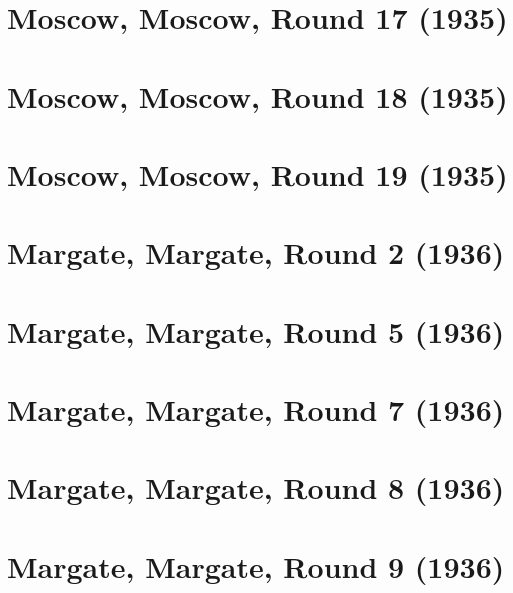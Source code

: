 \documentclass[11pt]{article}
\begin{document}
\section{Moscow, Moscow, Round 17 (1935)}


\clearpage

\section{Moscow, Moscow, Round 18 (1935)}


\clearpage

\section{Moscow, Moscow, Round 19 (1935)}


\clearpage

\section{Margate, Margate, Round 2 (1936)}


\clearpage

\section{Margate, Margate, Round 5 (1936)}


\clearpage

\section{Margate, Margate, Round 7 (1936)}


\clearpage

\section{Margate, Margate, Round 8 (1936)}


\clearpage

\section{Margate, Margate, Round 9 (1936)}


\clearpage


\end{document}
